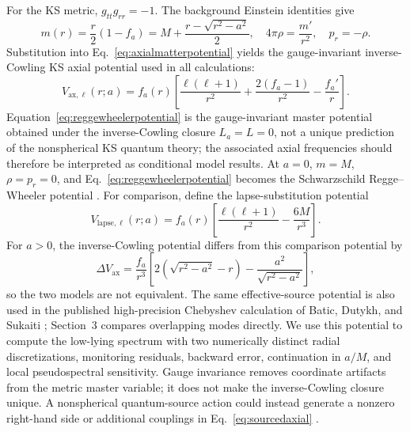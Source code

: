 \documentclass[12pt,a4paper]{article}
\begin{document}
For the KS metric, \(g_{tt}g_{rr}=-1\).  The background Einstein identities
give
\begin{equation}
m(r)=\frac{r}{2}\left(1-f_a\right)
=M+\frac{r-\sqrt{r^2-a^2}}{2},
\quad
4\pi\rho=\frac{m'}{r^2},
\quad
p_r=-\rho.
\label{eq:kseffectivesource}
\end{equation}
Substitution into Eq.~\eqref{eq:axialmatterpotential} yields the
gauge-invariant inverse-Cowling KS axial potential used in all calculations:
\begin{equation}
V_{\mathrm{ax},\ell}(r;a)
=f_a(r)\left[
\frac{\ell(\ell+1)}{r^2}
+\frac{2(f_a-1)}{r^2}
-\frac{f_a'}{r}\right].
\label{eq:reggewheelerpotential}
\end{equation}
Equation~\eqref{eq:reggewheelerpotential} is the gauge-invariant master
potential obtained under the inverse-Cowling closure \(L_a=L=0\), not a unique
prediction of the nonspherical KS quantum theory; the associated axial
frequencies should therefore be interpreted as conditional model results.
At \(a=0\), \(m=M\), \(\rho=p_r=0\), and
Eq.~\eqref{eq:reggewheelerpotential} becomes the Schwarzschild
Regge--Wheeler potential \cite{Regge1957}. For comparison, define the
lapse-substitution potential
\begin{equation}
V_{\mathrm{lapse},\ell}(r;a)
=f_a(r)\left[\frac{\ell(\ell+1)}{r^2}-\frac{6M}{r^3}\right].
\label{eq:lapsecomparison}
\end{equation}
For \(a>0\), the inverse-Cowling potential differs from this comparison
potential by
\begin{equation}
\Delta V_{\mathrm{ax}}
=\frac{f_a}{r^3}\left[
2\!\left(\sqrt{r^2-a^2}-r\right)
-\frac{a^2}{\sqrt{r^2-a^2}}\right],
\label{eq:axialproxycorrection}
\end{equation}
so the two models are not equivalent.  The same
effective-source potential is also used in the published high-precision
Chebyshev calculation of Batic, Dutykh, and Sukaiti
\cite{BaticDutykhSukaiti2026}; Section~3 compares overlapping modes directly.
We use this potential to compute the low-lying spectrum with two numerically
distinct radial discretizations, monitoring residuals, backward error, continuation in
\(a/M\), and local pseudospectral sensitivity. Gauge
invariance removes coordinate artifacts from the metric master variable; it
does not make the inverse-Cowling closure unique.  A nonspherical quantum-source
action could instead generate a nonzero right-hand side or additional
couplings in Eq.~\eqref{eq:sourcedaxial} \cite{Gerlach1979,Gundlach1999,Karlovini2002}.
\color{black}
\end{document}
